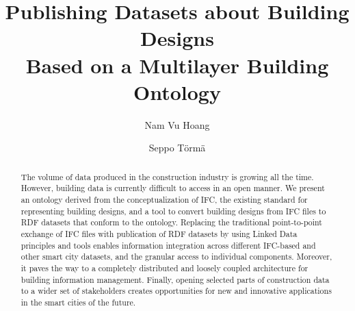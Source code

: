 \documentclass[envcountsame]{llncs}
\begin{document}
%
\frontmatter          %
%
\pagestyle{headings}  %
%


%
\title{Publishing Datasets about Building Designs \\Based on a Multilayer Building Ontology}
%
%
\author{Nam Vu Hoang \and Seppo T\"orm\"a}
%
%

\maketitle              %

\begin{abstract}

The volume of data produced in the construction industry is growing all the time. However, building data is currently difficult to access in an open manner. We present an ontology derived from the conceptualization of IFC, the existing standard for representing building designs, and a tool to convert building designs from IFC files to RDF datasets that conform to the ontology. Replacing the traditional point-to-point exchange of IFC files with publication of RDF datasets  by using Linked Data principles and tools enables information integration across different IFC-based and other smart city datasets, and the granular access to individual components. Moreover, it paves the way to a completely distributed and loosely coupled architecture for building information management. Finally, opening selected parts of construction data to a wider set of stakeholders creates opportunities for new and innovative applications in the smart cities of the future.


\end{abstract}









\clearpage
{} %
\renewcommand{\indexname}{Author Index}
\printindex
\clearpage
{} %
\renewcommand{\indexname}{Subject Index}
% 
\end{document}
